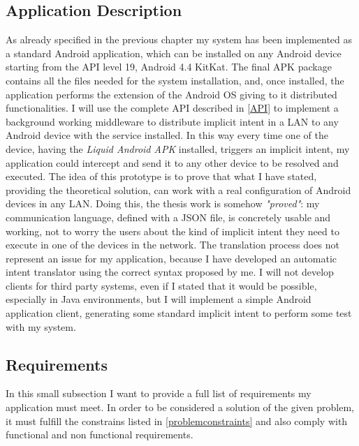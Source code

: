 \subsection{Application Description}
As already specified in the previous chapter my system has been implemented as a standard Android application, which can be installed on any Android device starting from the API level 19, Android 4.4 KitKat. The final APK package contains all the files needed for the system installation, and, once installed, the application performs the extension of the Android OS giving to it distributed functionalities. I will use the complete API described in \ref{API} to implement a background working middleware to distribute implicit intent in a LAN to any Android device with the service installed. In this way every time one of the device, having the \textit{Liquid Android APK}
installed, triggers an implicit intent, my application could intercept and send it to any other device to be resolved and executed. The idea of this prototype is to prove that what I have stated, providing the theoretical solution, can work with a real configuration of Android devices in any LAN. Doing this, the thesis work is somehow \textit{"proved"}: my communication language, defined with a JSON file, is concretely usable and working, not to worry the users about the kind of implicit intent they need to execute in one of the devices in the network. The translation process does not represent an issue for my application, because I have developed an automatic intent translator using the correct syntax proposed by me. I will not develop clients for third party systems, even if I stated that it would be possible, especially in Java environments, but I will implement a simple Android application client, generating some standard implicit intent to perform some test with my system.
\subsection{Requirements}
In this small subsection I want to provide a full list of requirements my application must meet. In order to be considered a solution of the given problem, it must fulfill the constrains listed in \ref{problemconstraints} and also comply with functional and non functional requirements.
